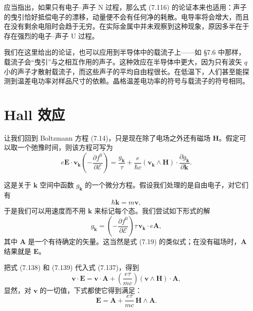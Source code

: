 
应当指出，如果只有电子--声子 N 过程，那么式 (7.116) 的论证本来也适用：声子的曳引恰好抵偿电子的漂移，动量便不会有任何净的耗散。电导率将会增大，而且在没有剩余电阻时会趋于无穷。在实际金属中并未观察到这种现象，原因多半在于存在强烈的电子--声子 U 过程。

我们在这里给出的论证，也可以应用到半导体中的载流子上——如 §7.6 中那样，载流子会“曳引”与之相互作用的声子。这种效应在半导体中更大，因为只有波矢 $q$ 小的声子才散射载流子，而这些声子的平均自由程很长。在低温下，人们甚至能探测到温差电功率对样品尺寸的依赖。晶格温差电功率的符号与载流子的符号相同。

\section{Hall 效应}

让我们回到 Boltzmann 方程 (7.14)，只是现在除了电场之外还有磁场 $\mathbf{H}$。假定可以取一个弛豫时间，则该方程可写为
\begin{equation*}
e\mathbf{E}\cdot\mathbf{v}_{\mathbf{k}}\left(-\frac{\partial f^{0}}{\partial\mathcal{E}}\right)=\frac{g_{\mathbf{k}}}{\tau}+\frac{e}{\hbar c}\left(\mathbf{v}_{\mathbf{k}}\wedge\mathbf{H}\right)\cdot\frac{\partial g_{\mathbf{k}}}{\partial\mathbf{k}}.\tag{7.137}
\end{equation*}

这是关于 $\mathbf{k}$ 空间中函数 $g_{\mathbf{k}}$ 的一个微分方程。假设我们处理的是自由电子，对它们有
\begin{equation*}
\hbar\mathbf{k}=m\mathbf{v},\tag{7.138}
\end{equation*}
于是我们可以用速度而不用 $\mathbf{k}$ 来标记每个态。我们尝试如下形式的解
\begin{equation*}
g_{\mathbf{k}}=\left(-\frac{\partial f^{0}}{\partial\mathcal{E}}\right)\tau\,\mathbf{v}_{\mathbf{k}}\cdot e\mathbf{A},\tag{7.139}
\end{equation*}
其中 $\mathbf{A}$ 是一个有待确定的矢量。这当然是式 (7.19) 的类似式；在没有磁场时，$\mathbf{A}$ 结果就是 $\mathbf{E}$。

把式 (7.138) 和 (7.139) 代入式 (7.137)，得到
\begin{equation*}
\mathbf{v}\cdot\mathbf{E}=\mathbf{v}\cdot\mathbf{A}+\left(\frac{e\tau}{mc}\right)\left(\mathbf{v}\wedge\mathbf{H}\right)\cdot\mathbf{A},\tag{7.140}
\end{equation*}
显然，对 $\mathbf{v}$ 的一切值，下式都使它得到满足：
\begin{equation*}
\mathbf{E}=\mathbf{A}+\frac{e\tau}{mc}\,\mathbf{H}\wedge\mathbf{A}.\tag{7.141}
\end{equation*}

